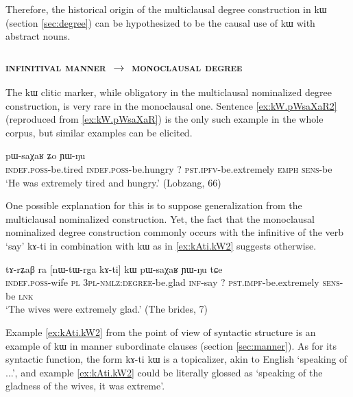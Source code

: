 \documentclass[oldfontcommands,oneside,a4paper,11pt]{article}
\newcommand{\ipa}[1]{{\phon #1}} %
\begin{document}
Therefore, the historical origin of the multiclausal   degree construction in \ipa{kɯ}   (section \ref{sec:degree})   can be hypothesized to be  the causal use of \ipa{kɯ}   with abstract nouns.  

 
 \subsubsection{ \textsc{infinitival manner} $\rightarrow$  \textsc{monoclausal degree}} \label{sec:manner2adj}
The  \ipa{kɯ} clitic marker, while obligatory in the multiclausal nominalized degree construction, is very rare in the monoclausal one. Sentence \ref{ex:kW.pWsaXaR2}  (reproduced from \ref{ex:kW.pWsaXaR}) is the only such example in the whole corpus, but similar examples can be elicited.

      \begin{exe}
  \ex  \label{ex:kW.pWsaXaR2}  
  \gll 
   [\ipa{tɤ-ɣɲat}  	\ipa{tɤ-mtsɯr}]  	\ipa{kɯ}  	\ipa{pɯ-saχaʁ}  	\ipa{ʑo}  	\ipa{ɲɯ-ŋu}  \\
      \textsc{indef.poss}-be.tired     \textsc{indef.poss}-be.hungry ?{ } \textsc{pst.ipfv}-be.extremely \textsc{emph} \textsc{sens}-be \\
      \glt `He was extremely tired and hungry.' (Lobzang, 66)
   \end{exe} 

One possible explanation for this is to suppose generalization from the multiclausal nominalized construction. Yet, the fact that the monoclausal nominalized degree construction commonly occurs with the infinitive of the verb `say' \ipa{kɤ-ti} in combination with   \ipa{kɯ} as in \ref{ex:kAti.kW2}  suggests otherwise.
      \begin{exe}
  \ex  \label{ex:kAti.kW2}  
  \gll 
\ipa{tɤ-rʑaβ} 	\ipa{ra} 	 	[\ipa{nɯ-tɯ-rga} 	\ipa{kɤ-ti}] 	\ipa{kɯ} 	\ipa{pɯ-saχaʁ} 	\ipa{ɲɯ-ŋu} 	\ipa{tɕe} \\
\textsc{indef.poss}-wife \textsc{pl} \textsc{3pl-nmlz:degree}-be.glad \textsc{inf}-say ?{ } \textsc{pst.impf}-be.extremely \textsc{sens}-be \textsc{lnk} \\
\glt `The wives were extremely glad.' (The brides, 7)
   \end{exe} 
   
Example \ref{ex:kAti.kW2}  from the point of view of syntactic structure is an example of \ipa{kɯ} in manner subordinate clauses (section \ref{sec:manner}). As for its syntactic function, the form \ipa{kɤ-ti kɯ} is a topicalizer, akin to English  `speaking of ...', and example \ref{ex:kAti.kW2}  could be literally glossed as `speaking of the gladness of the wives, it was extreme'. 
 
\end{document}
